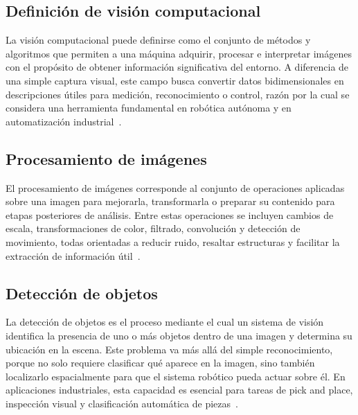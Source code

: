 \subsection{Definición de visión computacional}
La visión computacional puede definirse como el conjunto de métodos y algoritmos que permiten a una máquina adquirir, procesar e interpretar imágenes con el propósito de obtener información significativa del entorno. A diferencia de una simple captura visual, este campo busca convertir datos bidimensionales en descripciones útiles para medición, reconocimiento o control, razón por la cual se considera una herramienta fundamental en robótica autónoma y en automatización industrial~\cite{correll2022autonomous,corke2017robotics}.

\subsection{Procesamiento de imágenes}
El procesamiento de imágenes corresponde al conjunto de operaciones aplicadas sobre una imagen para mejorarla, transformarla o preparar su contenido para etapas posteriores de análisis. Entre estas operaciones se incluyen cambios de escala, transformaciones de color, filtrado, convolución y detección de movimiento, todas orientadas a reducir ruido, resaltar estructuras y facilitar la extracción de información útil~\cite{corke2017robotics,correll2022autonomous}.

\subsection{Detección de objetos}
La detección de objetos es el proceso mediante el cual un sistema de visión identifica la presencia de uno o más objetos dentro de una imagen y determina su ubicación en la escena. Este problema va más allá del simple reconocimiento, porque no solo requiere clasificar qué aparece en la imagen, sino también localizarlo espacialmente para que el sistema robótico pueda actuar sobre él. En aplicaciones industriales, esta capacidad es esencial para tareas de pick and place, inspección visual y clasificación automática de piezas~\cite{correll2022autonomous}.


